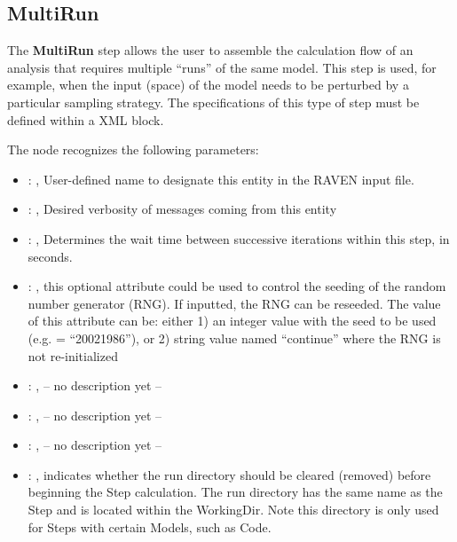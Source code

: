 

\subsection{MultiRun}
   The \textbf{MultiRun} step allows the user to assemble the calculation flow of an analysis that
  requires multiple ``runs'' of the same model. This step is used, for example, when the input
  (space) of the model needs to be perturbed by a particular sampling strategy. The specifications
  of this type of step must be defined within a  XML block.

  The  node recognizes the following parameters:
    \begin{itemize}
      \item {}: , 
        User-defined name to designate this entity in the RAVEN input file. 
      \item {}: , 
        Desired verbosity of messages coming from this entity 
      \item {}: , 
        Determines the wait time between successive iterations within this step, in seconds. 
      \item {}: , 
         this optional attribute could be used to control the seeding of the random number generator
        (RNG). If inputted, the RNG can be reseeded. The value of this attribute can be: either 1)
        an integer value with the seed to be used (e.g.  = ``20021986''), or 2)
        string value named ``continue'' where the RNG is not re-initialized 
      \item {}: , 
        -- no description yet -- 
      \item {}: , 
        -- no description yet -- 
      \item {}: , 
        -- no description yet -- 
      \item {}: , 
        indicates whether the run directory should be cleared (removed) before beginning
        the Step calculation. The run directory has the same name as the Step and is located
        within the WorkingDir. Note this directory is only used for Steps with certain Models,
        such as Code.                
  \end{itemize}

